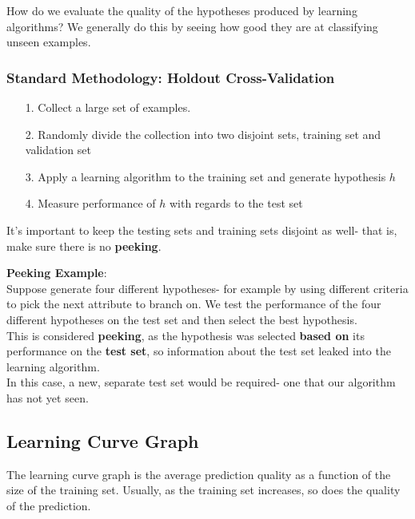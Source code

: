 \documentclass[english, 10pt]{article}
\begin{document}
How do we evaluate the quality of the hypotheses produced by learning algorithms? We generally do this by seeing how good they are at classifying unseen examples.

\subsubsection{Standard Methodology: Holdout Cross-Validation}

\begin{itemize}
	\item[1.] Collect a large set of examples.
	\item[2.] Randomly divide the collection into two disjoint sets, training set and validation set
	\item[3.] Apply a learning algorithm to the training set and generate hypothesis $h$
	\item[4.] Measure performance of $h$ with regards to the test set
\end{itemize}

It's important to keep the testing sets and training sets disjoint as well- that is, make sure there is no \textbf{peeking}.\\

\begin{myproof}
\textbf{Peeking Example}:\\
Suppose generate four different hypotheses- for example by using different criteria to pick the next attribute to branch on.
We test the performance of the four different hypotheses on the test set and then select the best hypothesis.\\

This is considered \textbf{peeking}, as the hypothesis was selected \textbf{based on} its performance on the \textbf{test set}, so information about the test set leaked into the learning algorithm.\\

In this case, a new, separate test set would be required- one that our algorithm has not yet seen.
\end{myproof}

\subsection{Learning Curve Graph}

The learning curve graph is the average prediction quality as a function of the size of the training set. Usually, as the training set increases, so does the quality of the prediction.
\end{document}

